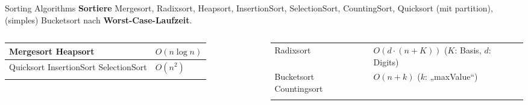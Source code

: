 \begin{frame}{Sorting Algorithms}
	\textbf{Sortiere} Mergesort, Radixsort, Heapsort, InsertionSort, SelectionSort, CountingSort, Quicksort {\small (mit partition)}, (simples) Bucketsort nach \textbf{Worst-Case-Laufzeit}. \\ 
	\pause
	\forcenewline
	\begin{columns}
		\begin{tabular}{m{.4\linewidth} | m{.3\linewidth} }
			\hhline{=|=}
			Mergesort \newline
			Heapsort & $O(n \log n)$ \\
			\hline
			Quicksort \newline 
			InsertionSort \newline 
			SelectionSort & $O(n^2)$ \\
			\hhline{=|=}
		\end{tabular}
		\hspace{-2\baselineskip}
		\begin{tabular}{m{.37\linewidth} | m{.47\linewidth} }
			\hhline{=|=}
			Radixsort & $O(d \cdot (n + K))$ \newline ($K$: Basis, \newline $d$: Digits)\\
			\hhline{=|=}
			Bucketsort \newline
			Countingsort & $O(n+k)$ \newline ($k$: „maxValue“) \\
			\hhline{=|=}
		\end{tabular}
	\end{columns}
\end{frame}

